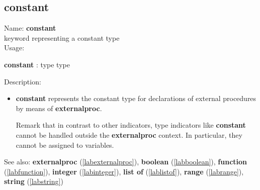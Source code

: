 \subsection{constant}
\label{labconstant}
\noindent Name: \textbf{constant}\\
keyword representing a \textsf{constant} type \\

\noindent Usage: 
\begin{center}
\textbf{constant} : \textsf{type type}\\
\end{center}
\noindent Description: \begin{itemize}

\item \textbf{constant} represents the \textsf{constant} type for declarations
   of external procedures by means of \textbf{externalproc}.
    
   Remark that in contrast to other indicators, type indicators like
   \textbf{constant} cannot be handled outside the \textbf{externalproc} context.  In
   particular, they cannot be assigned to variables.
\end{itemize}
See also: \textbf{externalproc} (\ref{labexternalproc}), \textbf{boolean} (\ref{labboolean}), \textbf{function} (\ref{labfunction}), \textbf{integer} (\ref{labinteger}), \textbf{list of} (\ref{lablistof}), \textbf{range} (\ref{labrange}), \textbf{string} (\ref{labstring})
